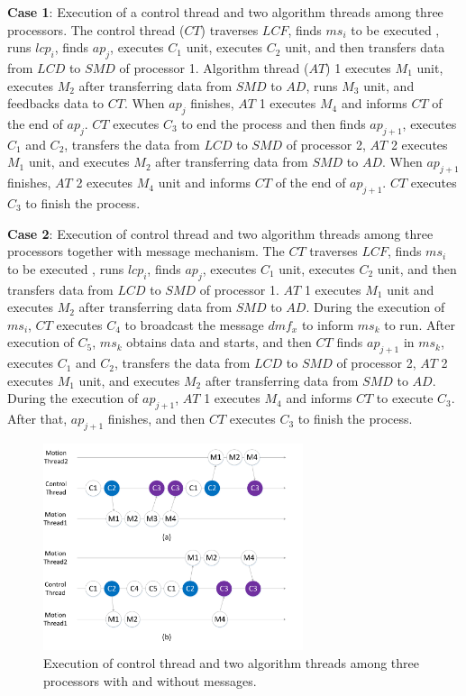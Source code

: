 \documentclass[journal,UTF8]{IEEEtran}
\begin{document}
	\textbf{Case 1}: Execution of a control thread and two algorithm threads among three processors. The control thread ($CT$) traverses $LCF$, finds $ms_i$ to be executed , runs $lcp_i$, finds $ap_j$, executes $C_1$ unit, executes $C_2$ unit, and then transfers data from $LCD$ to $SMD$ of processor 1. Algorithm thread ($AT$) 1 executes $M_1$ unit, executes $M_2$ after transferring data from $SMD$ to $AD$, runs $M_3$ unit, and feedbacks data to $CT$. When $ap_j$ finishes, $AT$ 1 executes $M_4$ and informs $CT$ of the end of $ap_j$. $CT$ executes $C_3$ to end the process and then finds $ap_{j+1}$, executes $C_1$ and $C_2$, transfers the data from $LCD$ to $SMD$ of processor 2, $AT$ 2 executes $M_1$ unit, and executes $M_2$ after transferring data from $SMD$ to $AD$. When $ap_{j+1}$ finishes, $AT$ 2 executes $M_4$ unit and informs $CT$ of the end of $ap_{j+1}$. $CT$ executes $C_3$ to finish the process.
	
	\textbf{Case 2}: Execution of control thread and two algorithm threads among three processors together with message mechanism. The $CT$ traverses $LCF$, finds $ms_i$ to be executed , runs $lcp_i$, finds $ap_j$, executes $C_1$ unit, executes $C_2$ unit, and then transfers data from $LCD$ to $SMD$ of processor 1. $AT$ 1 executes $M_1$ unit and executes $M_2$ after transferring data from $SMD$ to $AD$. During the execution of $ms_i$, $CT$ executes $C_4$ to broadcast the message $dmf_x$ to inform $ms_{k}$ to run. After execution of $C_5$, $ms_{k}$ obtains data and starts, and then $CT$ finds $ap_{j+1}$ in $ms_{k}$, executes $C_1$ and $C_2$, transfers the data from $LCD$ to $SMD$ of processor 2, $AT$ 2 executes $M_1$ unit, and executes $M_2$ after transferring data from $SMD$ to $AD$. During the execution of $ap_{j+1}$, $AT$ 1 executes $M_4$ and informs $CT$ to execute $C_3$. After that, $ap_{j+1}$ finishes, and then $CT$ executes $C_3$ to finish the process.
	
	
	
	\begin{figure}
		\centering
		\includegraphics[width=3in]{fig/threadFlow.pdf}
		\caption{ Execution of control thread and two algorithm threads among three processors with and without messages.}
		\label{fig:threadFlow}
	\end{figure}
\end{document}
